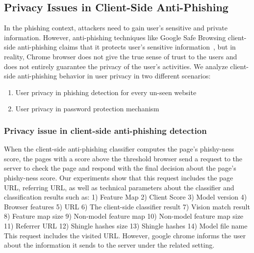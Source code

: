 \documentclass[letterpaper,twocolumn,10pt]{article}
\begin{document}
\subsection{Privacy Issues in Client-Side Anti-Phishing }

In the phishing context, attackers need to gain user's sensitive and private information. However, anti-phishing techniques like Google Safe Browsing client-side anti-phishing claims that it protects user's sensitive information~\cite{googlechromeprivacywhitepaper}, but in reality, Chrome browser does not give the true sense of trust to the users and does not entirely guarantee the privacy of the user's activities.
We analyze client-side anti-phishing behavior in user privacy in two different scenarios:
\begin{enumerate}
    \item User privacy in phishing detection for every un-seen website
    \item User privacy in password protection mechanism
\end{enumerate}

\subsubsection{Privacy issue in client-side anti-phishing detection} 

When the client-side anti-phishing classifier computes the page's phishy-ness score, the pages with a score above the threshold browser send a request to the server to check the page and respond with the final decision about the page's phishy-ness score. 
Our experiments show that this request includes the page URL, referring URL, as well as technical parameters about the classifier and classification results such as:
1) Feature Map
2) Client Score
3) Model version
4) Browser features
5) URL
6) The client-side classifier result
7) Vision match result
8) Feature map size
9) Non-model feature map
10) Non-model feature map size
11) Referrer URL
12) Shingle hashes size
13) Shingle hashes
14) Model file name
This request includes the visited URL.
However, google chrome informs the user about the information it sends to the server under the related setting.

\end{document}
